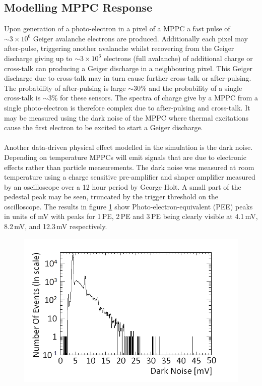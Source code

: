 \subsection{Modelling MPPC Response}\label{sec:GEANT4Simulation_ModellingDarkNoise}
Upon generation of a photo-electron in a pixel of a MPPC a fast pulse of $\sim 3 \times 10^6$ Geiger avalanche electrons are produced. Additionally each pixel may after-pulse, triggering another avalanche  whilst recovering
from the Geiger discharge giving up to $\sim 3 \times 10^6$ electrons (full avalanche)  of additional charge or cross-talk can producing a Geiger discharge in a neighbouring pixel. This Geiger discharge due to cross-talk may in turn cause further cross-talk or after-pulsing. The probability of after-pulsing is large $\sim 30 \%$ and the probability of a single cross-talk is $\sim 3 \%$ for these sensors. The spectra of charge give by a MPPC from a single photo-electron is therefore complex due to after-pulsing and cross-talk. It may be measured using the dark noise of the MPPC where thermal excitations cause the first electron to be excited to start a Geiger discharge.
\\\\Another data-driven physical effect modelled in the simulation is the dark noise. Depending on temperature MPPCs will emit signals that are due to electronic effects rather than particle measurements. The dark noise was measured at room temperature using a charge sensitive pre-amplifier and shaper amplifier measured by an oscilloscope  over a 12 hour period by George Holt. A small part of the pedestal peak may be seen, truncated by the trigger threshold on the oscilloscope. The results in figure \ref{fig:pureDarkNoise} show Photo-electron-equivalent (PEE) peaks in units of mV with peaks for 1\,PE, 2\,PE and 3\,PE being clearly visible at 4.1\,mV, 8.2\,mV, and 12.3\,mV respectively. 
\begin{figure}[!h]
 \centering
 \includegraphics[width=0.7\linewidth]{Chapter4/Figs/Raster/pureDarkNoise_outputMedText.png}
 \label{fig:pureDarkNoise}
\end{figure}

